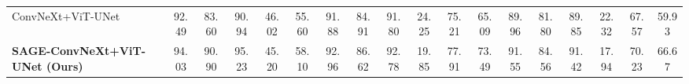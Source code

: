 \begin{table}[t]
{\begin{tabular}{l|ccccc|cccccc|cccccc}
\midrule

ConvNeXt+ViT-UNet 
& \cellcolor{SecondBestColor}\textcolor{SecondBestTextColor}{92.49} & 83.60 & 90.94 & 46.02 & 55.60 
& 91.88 & 84.91 & 91.80 & 24.25 & \cellcolor{SecondBestColor}\textcolor{SecondBestTextColor}{75.21} & \cellcolor{SecondBestColor}\textcolor{SecondBestTextColor}{65.09} 
& \cellcolor{SecondBestColor}\textcolor{SecondBestTextColor}{89.96} & 81.80 & 89.85 & 22.32 & \cellcolor{SecondBestColor}\textcolor{SecondBestTextColor}{67.57} & \cellcolor{SecondBestColor}\textcolor{SecondBestTextColor}{59.93} \\


\textbf{SAGE-ConvNeXt+ViT-UNet (Ours)} 
& \cellcolor{BestColor}\textcolor{BestTextColor}{94.03} & \cellcolor{BestColor}\textcolor{BestTextColor}{90.90} & \cellcolor{BestColor}\textcolor{BestTextColor}{95.23} & \cellcolor{BestColor}\textcolor{BestTextColor}{45.20} & \cellcolor{BestColor}\textcolor{BestTextColor}{58.10} 
& \cellcolor{BestColor}\textcolor{BestTextColor}{92.96} & \cellcolor{BestColor}\textcolor{BestTextColor}{86.62} & \cellcolor{BestColor}\textcolor{BestTextColor}{92.78} & \cellcolor{BestColor}\textcolor{BestTextColor}{19.85} & \cellcolor{BestColor}\textcolor{BestTextColor}{77.91} & \cellcolor{BestColor}\textcolor{BestTextColor}{73.49} 
& \cellcolor{BestColor}\textcolor{BestTextColor}{91.55} & \cellcolor{BestColor}\textcolor{BestTextColor}{84.56} & \cellcolor{BestColor}\textcolor{BestTextColor}{91.42} & \cellcolor{BestColor}\textcolor{BestTextColor}{17.94} & \cellcolor{BestColor}\textcolor{BestTextColor}{70.23} & \cellcolor{BestColor}\textcolor{BestTextColor}{66.67} \\
\bottomrule
\end{tabular}
}%
\setlength{\tabcolsep}{6pt}
\setlength{\arrayrulewidth}{0.4pt}
\end{table}



